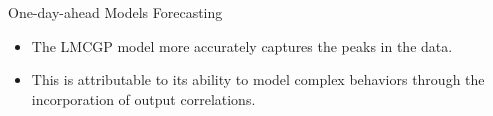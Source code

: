 \begin{frame}{One-day-ahead Models Forecasting}
	\centering
	\begin{figure}[htbp]
		\tiny
		\setlength{} 
		\setlength{}
		
		
	\end{figure}
	\vspace{-1.5em}
\begin{itemize}
	\item The LMCGP model more accurately captures the peaks in the data.
	\item This is attributable to its ability to model complex behaviors through the incorporation of output correlations.
\end{itemize}

\end{frame}



%		
%		
%		
%		
